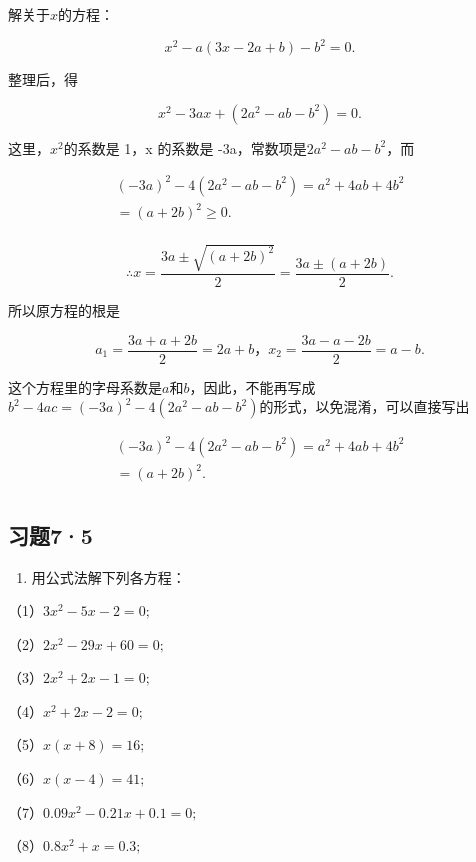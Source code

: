 解关于\(x\)的方程：

\[
x ^ {2} - a (3 x - 2 a + b) - b ^ {2} = 0.
\]

 整理后，得

\[
x ^ {2} - 3 a x + (2 a ^ {2} - a b - b ^ {2}) = 0.
\]

这里，\(x^{2}\)的系数是 1，x 的系数是
-3a，常数项是\(2a^{2}-ab-b^{2}\)，而

\[
\begin{array}{l} (- 3 a) ^ {2} - 4 (2 a ^ {2} - a b - b ^ {2}) = a ^ {2} + 4 a b + 4 b ^ {2} \\ = (a + 2 b) ^ {2} \geqslant 0. \\ \end{array}
\]

\[
\therefore x = \frac{3 a \pm \sqrt {(a + 2 b) ^ {2}}}{2} = \frac{3 a \pm (a + 2 b)}{2}.
\]

所以原方程的根是

\[
a _ {1} = \frac{3 a + a + 2 b}{2} = 2 a + b\text{，} x _ {2} = \frac{3 a - a - 2 b}{2} = a - b.
\]

这个方程里的字母系数是\(a\)和\(b\)，因此，不能再写成\(b^2 - 4ac = (-3a)^2 - 4(2a^2 - ab - b^2)\)的形式，以免混淆，可以直接写出

\[
\begin{array}{l} (- 3 a) ^ {2} - 4 (2 a ^ {2} - a b - b ^ {2}) = a ^ {2} + 4 a b + 4 b ^ {2} \\ = (a + 2 b) ^ {2}. \\ \end{array}
\]

\subsection{习题7·5}

\begin{enumerate}
\item
  用公式法解下列各方程：
\end{enumerate}

（1）\(3x^{2} - 5x - 2 = 0;\)

（2）\(2x^{2} - 29x + 60 = 0;\)

（3）\(2x^{2} + 2x - 1 = 0;\)

（4）\(x^{2} + 2x - 2 = 0;\)

（5）\(x(x + 8) = 16;\)

（6）\(x(x - 4) = 41;\)

（7）\(0.09x^{2} - 0.21x + 0.1 = 0;\)

（8）\(0.8x^{2} + x = 0.3;\)

